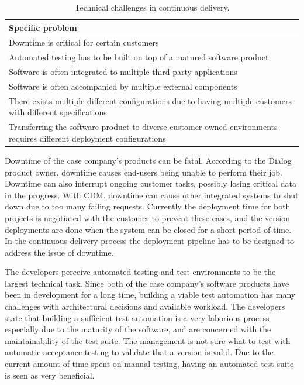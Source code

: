 \documentclass[english]{tktltiki2}
\theoremstyle{definition}
\theoremstyle{remark}
\begin{document}
\begin{center}
\begin{table}[htb]
    \begin{tabular}{ | p{12cm} |}
    \hline
    \textbf{Specific problem} \\ \hline
    Downtime is critical for certain customers \\ \hline
    Automated testing has to be built on top of a matured software product \\ \hline
    Software is often integrated to multiple third party applications \\ \hline
    Software is often accompanied by multiple external components \\ \hline
    There exists multiple different configurations due to having multiple customers with different specifications \\ \hline
    Transferring the software product to diverse customer-owned environments requires different deployment configurations \\ 
    \hline
    \end{tabular}
    \caption{Technical challenges in continuous delivery.}
    \end{table}
\end{center}
Downtime of the case company's products can be fatal. According to the Dialog product owner, downtime causes end-users being unable to perform their job. Downtime can also interrupt ongoing customer tasks, possibly losing critical data in the progress. With CDM, downtime can cause other integrated systems to shut down due to too many failing requests. Currently the deployment time for both projects is negotiated with the customer to prevent these cases, and the version deployments are done when the system can be closed for a short period of time. In the continuous delivery process the deployment pipeline has to be designed to address the issue of downtime.

The developers perceive automated testing and test environments to be the largest technical task. Since both of the case company's software products have been in development for a long time, building a viable test automation has many challenges with architectural decisions and available workload. The developers state that building a sufficient test automation is a very laborious process especially due to the maturity of the software, and are concerned with the maintainability of the test suite. The management is not sure what to test with automatic acceptance testing to validate that a version is valid. Due to the current amount of time spent on manual testing, having an automated test suite is seen as very beneficial.%
\end{document}
